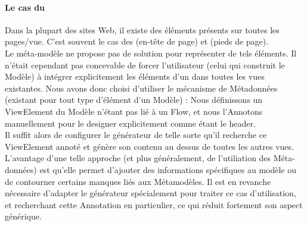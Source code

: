 \paragraph{Le cas du }
Dans la plupart des sites Web, il existe des éléments présents sur toutes les pages/vue. C'est souvent le cas des  (en-tête de page) et  (pieds de page).\\
Le méta-modèle \kwcinematic ne propose pas de solution pour représenter de tels éléments. Il n'était cependant pas concevable de forcer l'utilisateur (celui qui construit le Modèle) à intégrer explicitement les éléments d'un  dans toutes les vues existantes.
Nous avons donc choisi d'utiliser le mécanisme de Métadonnées (existant pour tout type d'élément d'un Modèle) : Nous définissons un ViewElement du Modèle n'étant pas lié à un Flow, et nous l'Annotons manuellement pour le designer explicitement comme étant le header.\\
Il suffit alors de configurer le générateur de telle sorte qu'il recherche ce ViewElement annoté et génère son contenu au dessus de toutes les autres vues. L'avantage d'une telle approche (et plus généralement, de l'utiliation des Méta-données) est qu'elle permet d'ajouter des informations spécifiques au modèle ou de contourner certains manques liés aux Métamodèles. Il est en revanche nécessaire d'adapter le générateur spécialement pour traiter ce cas d'utilisation, et recherchant cette Annotation en particulier, ce qui réduit fortement son aspect générique.

